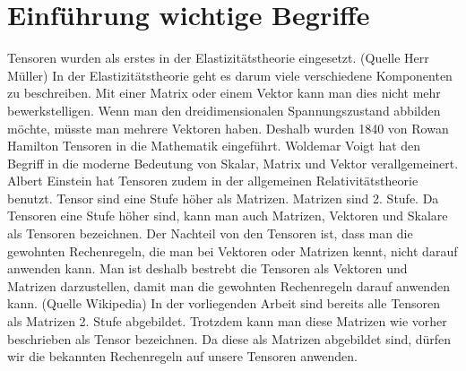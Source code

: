 \section{Einführung wichtige Begriffe\label{spannung:section:Tensoren}}
Tensoren wurden als erstes in der Elastizitätstheorie eingesetzt. (Quelle Herr Müller)
In der Elastizitätstheorie geht es darum viele verschiedene Komponenten zu beschreiben.
Mit einer Matrix oder einem Vektor kann man dies nicht mehr bewerkstelligen.
Wenn man den dreidimensionalen Spannungszustand abbilden möchte, müsste man mehrere Vektoren haben.
Deshalb wurden 1840 von Rowan Hamilton Tensoren in die Mathematik eingeführt.
Woldemar Voigt hat den Begriff in die moderne Bedeutung von Skalar, Matrix und Vektor verallgemeinert.
Albert Einstein hat Tensoren zudem in der allgemeinen Relativitätstheorie benutzt.
Tensor sind eine Stufe höher als Matrizen. Matrizen sind 2. Stufe.
Da Tensoren eine Stufe höher sind, kann man auch Matrizen, Vektoren und Skalare als Tensoren bezeichnen.
Der Nachteil von den Tensoren ist, dass man die gewohnten Rechenregeln, die man bei Vektoren oder Matrizen kennt,
nicht darauf anwenden kann. Man ist deshalb bestrebt die Tensoren als Vektoren und Matrizen darzustellen,
damit man die gewohnten Rechenregeln darauf anwenden kann. (Quelle Wikipedia)
In der vorliegenden Arbeit sind bereits alle Tensoren als Matrizen 2. Stufe abgebildet.
Trotzdem kann man diese Matrizen wie vorher beschrieben als Tensor bezeichnen.
Da diese als Matrizen abgebildet sind, dürfen wir die bekannten Rechenregeln auf unsere Tensoren anwenden.